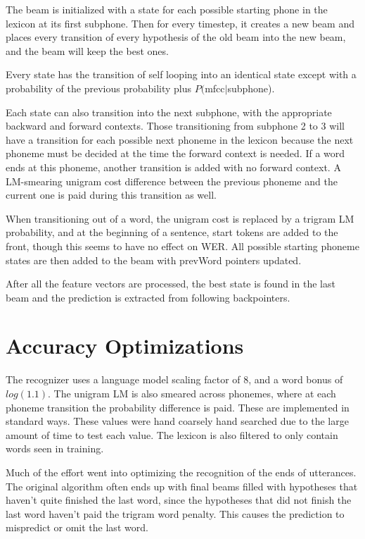 \documentclass[11pt]{article}
\begin{document}
The beam is initialized with a state for each possible starting phone in the lexicon at its first subphone. Then for every timestep, it creates a new beam and places every transition of every hypothesis of the old beam into the new beam, and the beam will keep the best ones. 

Every state has the transition of self looping into an identical state except with a probability of the previous probability plus $P($mfcc$|$subphone).

Each state can also transition into the next subphone, with the appropriate backward and forward contexts. Those transitioning from subphone 2 to 3 will have a transition for each possible next phoneme in the lexicon because the next phoneme must be decided at the time the forward context is needed. If a word ends at this phoneme, another transition is added with no forward context. A LM-smearing unigram cost difference between the previous phoneme and the current one is paid during this transition as well.

When transitioning out of a word, the unigram cost is replaced by a trigram LM probability, and at the beginning of a sentence, start tokens are added to the front, though this seems to have no effect on WER. All possible starting phoneme states are then added to the beam with prevWord pointers updated.

After all the feature vectors are processed, the best state is found in the last beam and the prediction is extracted from following backpointers. 

\section{Accuracy Optimizations}

The recognizer uses a language model scaling factor of 8, and a word bonus of $log(1.1)$. The unigram LM is also smeared across phonemes, where at each phoneme transition the probability difference is paid. These are implemented in standard ways. These values were hand coarsely hand searched due to the large amount of time to test each value. The lexicon is also filtered to only contain words seen in training.

Much of the effort went into optimizing the recognition of the ends of utterances. The original algorithm often ends up with final beams filled with hypotheses that haven't quite finished the last word, since the hypotheses that did not finish the last word haven't paid the trigram word penalty. This causes the prediction to mispredict or omit the last word. 
\end{document}
